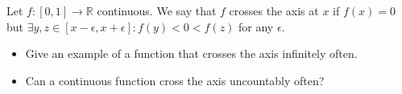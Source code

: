 Let \(f\colon  [0,1]\to \mathbb{R}\) continuous. We say that \(f\) crosses the axis at \(x\) if \(f(x)=0\) but \(\exists y,z \in [x-\epsilon,x+\epsilon]: f(y)<0<f(z)\) for any \(\epsilon\).
\begin{itemize}

\item[(a)] Give an example of a function that crosses the axis infinitely often.

\item[(b)] Can a continuous function cross the axis uncountably often?
\end{itemize}
